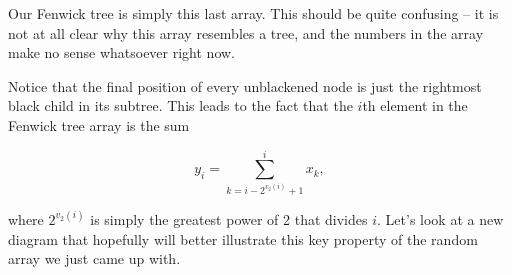 \begin{center}
{
}
\end{center}

Our Fenwick tree is simply this last array. This should be quite confusing -- it is not at all clear why this array resembles a tree, and the numbers in the array make no sense whatsoever right now.

Notice that the final position of every unblackened node is just the rightmost black child in its subtree. This leads to the fact that the $i$th element in the Fenwick tree array is the sum

\[y_i = \sum_{k=i-2^{v_2(i)}+1}^i x_k, \]

where $2^{v_2(i)}$ is simply the greatest power of 2 that divides $i$. Let's look at a new diagram that hopefully will better illustrate this key property of the random array we just came up with.

